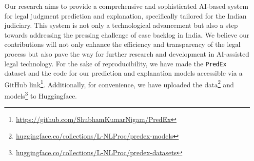 
Our research aims to provide a comprehensive and sophisticated AI-based system for legal judgment prediction and explanation, specifically tailored for the Indian judiciary. This system is not only a technological advancement but also a step towards addressing the pressing challenge of case backlog in India. We believe our contributions will not only enhance the efficiency and transparency of the legal process but also pave the way for further research and development in AI-assisted legal technology. For the sake of reproducibility, we have made the \texttt{PredEx} dataset and the code for our prediction and explanation models accessible via a GitHub link\footnote{\url{https://github.com/ShubhamKumarNigam/PredEx}}. Additionally, for convenience, we have uploaded the data\footnote{\href{https://huggingface.co/collections/L-NLProc/predex-models-66509d3f4de624770d690a48}{huggingface.co/collections/L-NLProc/predex-models}} and models\footnote{\href{https://huggingface.co/collections/L-NLProc/predex-datasets-6650a75907cc2255eab18d01}{huggingface.co/collections/L-NLProc/predex-datasets}} to Huggingface.

